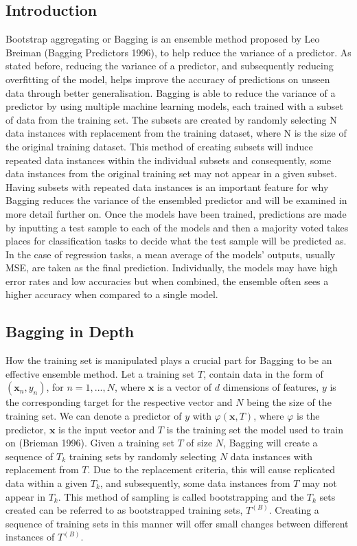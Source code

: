 \documentclass[../SMLreport_template.tex]{subfiles}
\begin{document}
\subsection{Introduction}

Bootstrap aggregating or Bagging is an ensemble method proposed by Leo Breiman (Bagging Predictors 1996), to help reduce the variance of a predictor. As stated before, reducing the variance of a predictor, and subsequently reducing overfitting of the model, helps improve the accuracy of predictions on unseen data through better generalisation. Bagging is able to reduce the variance of a predictor by using multiple machine learning models, each trained with a subset of data from the training set. The subsets are created by randomly selecting N data instances with replacement from the training dataset, where N is the size of the original training dataset. This method of creating subsets will induce repeated data instances within the individual subsets and consequently, some data instances from the original training set may not appear in a given subset. Having subsets with repeated data instances is an important feature for why Bagging reduces the variance of the ensembled predictor and will be examined in more detail further on. Once the models have been trained, predictions are made by inputting a test sample to each of the models and then a majority voted takes places for classification tasks to decide what the test sample will be predicted as. In the case of regression tasks, a mean average of the models’ outputs, usually MSE, are taken as the final prediction. Individually, the models may have high error rates and low accuracies but when combined, the ensemble often sees a higher accuracy when compared to a single model. 

\subsection{Bagging in Depth}
How the training set is manipulated plays a crucial part for Bagging to be an effective ensemble method. Let a training set ${T}$, contain data in the form of $(\bm{x}_{n},y_{n})$, for $n = 1,...,N$, where $\bm{x}$ is a vector of $d$ dimensions of features, $y$ is the corresponding target for the respective vector and $N$ being the size of the training set. We can denote a predictor of $y$ with $\varphi(\bm{x},T)$, where $\varphi$ is the predictor, $\bm{x}$ is the input vector and $T$ is the training set the model used to train on (Brieman 1996). Given a training set $T$ of size $N$, Bagging will create a sequence of $T_{k}$ training sets by randomly selecting $N$ data instances with replacement from $T$. Due to the replacement criteria, this will cause replicated data within a given $T_{k}$, and subsequently, some data instances from $T$ may not appear in $T_{k}$. This method of sampling is called bootstrapping and the $T_{k}$ sets created can be referred to as bootstrapped training sets, $T^{(B)}$. Creating a sequence of training sets in this manner will offer small changes between different instances of $T^{(B)}$. 
\end{document}
